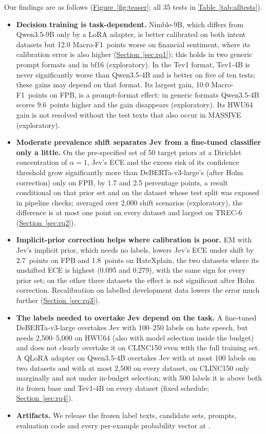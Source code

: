 Our findings are as follows (\hyperref[fig:teaser]{Figure~\ref*{fig:teaser}}; all 35 tests in \hyperref[tab:alltests]{Table~\ref*{tab:alltests}}).
\begin{itemize}
  \item \textbf{Decision training is task-dependent.} Nimble-9B, which differs from Qwen3.5-9B only by a LoRA
  adapter, is better calibrated on both intent datasets but 12.0 Macro-F1~points worse on financial sentiment, where
  its calibration error is also higher (\hyperref[sec:rq1]{Section~\ref*{sec:rq1}}); this holds in two generic prompt
  formats and in bf16 (exploratory). In the Tev1 format, Tev1-4B is never significantly worse than Qwen3.5-4B and is better on five of
  ten tests; these gains may depend on that format. Its largest gain, 10.0 Macro-F1~points on FPB, is a prompt-format effect: in generic formats Qwen3.5-4B
  scores 9.6~points higher and the gain disappears (exploratory). Its HWU64 gain is not resolved without the test
  texts that also occur in MASSIVE (exploratory).
  \item \textbf{Moderate prevalence shift separates Jev from a fine-tuned classifier only a little.} On the
  pre-specified set of 50 target priors at a Dirichlet concentration of $\alpha=1$, Jev's ECE and the excess risk of
  its confidence threshold grow significantly more than DeBERTa-v3-large's (after Holm correction) only on FPB, by 1.7
  and 2.5 percentage points, a result conditional on that prior set and on the dataset whose test split was exposed in
  pipeline checks; averaged over
  2{,}000 shift scenarios (exploratory), the difference is at most one point on every dataset and largest on TREC-6 (\hyperref[sec:rq2]{Section~\ref*{sec:rq2}}).
  \item \textbf{Implicit-prior correction helps where calibration is poor.} EM with Jev's implicit prior, which needs
  no labels, lowers Jev's ECE under shift by 2.7~points on FPB and 1.8~points on HateXplain, the two datasets where its
  unshifted ECE is highest (0.095 and 0.279), with the same sign for every prior set; on the other three datasets the
  effect is not significant after Holm correction. Recalibration on labelled development data lowers the error much
  further (\hyperref[sec:rq3]{Section~\ref*{sec:rq3}}).
  \item \textbf{The labels needed to overtake Jev depend on the task.} A fine-tuned
  DeBERTa-v3-large overtakes Jev with 100--250 labels on hate speech, but needs 2{,}500--5{,}000 on HWU64 (also with
  model selection inside the budget) and does not clearly overtake it on CLINC150 even with the full training set. A
  QLoRA adapter on Qwen3.5-4B overtakes Jev with at most 100 labels on two datasets and with at most 2{,}500 on every
  dataset, on CLINC150 only marginally and not under in-budget selection; with 500 labels it is above both its frozen base and Tev1-4B on every dataset
  (fixed schedule; \hyperref[sec:rq4]{Section~\ref*{sec:rq4}}).
  \item \textbf{Artifacts.} We release the frozen label texts, candidate sets, prompts, evaluation code and every
  per-example probability vector at \anonrepo.
\end{itemize}
